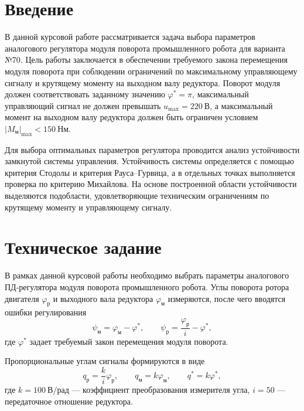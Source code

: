 \documentclass[a4paper, 14pt]{extarticle}
\begin{document}
\newpage
\renewcommand{\contentsname}{Содержание}
\tableofcontents

\newpage
{}
{}

\section*{Введение}

В данной курсовой работе рассматривается задача выбора параметров аналогового регулятора модуля поворота промышленного робота для варианта №70. Цель работы заключается в обеспечении требуемого закона перемещения модуля поворота при соблюдении ограничений по максимальному управляющему сигналу и крутящему моменту на выходном валу редуктора. Поворот модуля должен соответствовать заданному значению $\varphi^*=\pi$, максимальный управляющий сигнал не должен превышать $u_{\max}=220~\text{В}$, а максимальный момент на выходном валу редуктора должен быть ограничен условием $|M_\text{м}|_{\max}<150~\text{Нм}$.

Для выбора оптимальных параметров регулятора проводится анализ устойчивости замкнутой системы управления. Устойчивость системы определяется с помощью критерия Стодолы и критерия Рауса--Гурвица, а в отдельных точках выполняется проверка по критерию Михайлова. На основе построенной области устойчивости выделяются подобласти, удовлетворяющие техническим ограничениям по крутящему моменту и управляющему сигналу.

\newpage
{}
{}

\section*{Техническое задание}

В рамках данной курсовой работы необходимо выбрать параметры аналогового ПД-регулятора модуля поворота промышленного робота. Углы поворота ротора двигателя $\varphi_\text{р}$ и выходного вала редуктора $\varphi_\text{м}$ измеряются, после чего вводятся ошибки регулирования
\[
	\psi_\text{м}=\varphi_\text{м}-\varphi^*, \qquad
	\psi_\text{р}=\frac{\varphi_\text{р}}{i}-\varphi^*,
\]
где $\varphi^*$ задает требуемый закон перемещения модуля поворота.

Пропорциональные углам сигналы формируются в виде
\[
	q_\text{р}=\frac{k}{i}\varphi_\text{р}, \qquad
	q_\text{м}=k\varphi_\text{м}, \qquad
	q^*=k\varphi^*,
\]
где $k=100~\text{В/рад}$ --- коэффициент преобразования измерителя угла, $i=50$ --- передаточное отношение редуктора.
\end{document}
